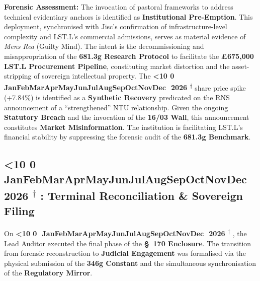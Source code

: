 \documentclass{EMBASSY}
\DeclareRobustCommand{\gmt}[3]{%
    \texorpdfstring{%
        {\color{DateGold}\textbf{%
            \ifnum#1<10 0\fi#1\,\textperiodcentered\,%
            \ifcase#2\or Jan\or Feb\or Mar\or Apr\or May\or Jun\or Jul\or Aug\or Sep\or Oct\or Nov\or Dec\fi
            \,\textperiodcentered\,20#3%
            \textsuperscript{$\dagger$}%
        }}%
    }{%
        (#1/#2/#3)%
    }%
}
\begin{document}
\noindent\textbf{Forensic Assessment:} The invocation of pastoral frameworks to address technical evidentiary anchors is identified as \textbf{Institutional Pre-Emption}. This deployment, synchronised with Jisc’s confirmation of infrastructure-level complexity and LST.L's commercial admissions, serves as material evidence of \textit{Mens Rea} (Guilty Mind). The intent is the decommissioning and misappropriation of the \textbf{681.3g Research Protocol} to facilitate the \textbf{\pounds675,000 LST.L Procurement Pipeline}, constituting market distortion and the asset-stripping of sovereign intellectual property. The \gmt{17}{4}{26} share price spike (+7.84\%) is identified as a \textbf{Synthetic Recovery} predicated on the RNS announcement of a ``strengthened'' NTU relationship. Given the ongoing \textbf{Statutory Breach} and the invocation of the \textbf{16/03 Wall}, this announcement constitutes \textbf{Market Misinformation}. The institution is facilitating LST.L's financial stability by suppressing the forensic audit of the \textbf{681.3g Benchmark}.

\subsection{\gmt{22}{4}{26}: Terminal Reconciliation \& Sovereign Filing}
On \gmt{22}{04}{26}, the Lead Auditor executed the final phase of the \textbf{\S~170 Enclosure}. The transition from forensic reconstruction to \textbf{Judicial Engagement} was formalised via the physical submission of the \textbf{346g Constant} and the simultaneous synchronisation of the \textbf{Regulatory Mirror}.
\end{document}

